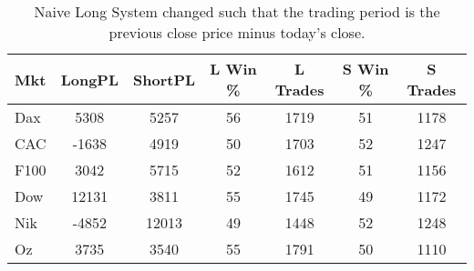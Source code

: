 \begin{table}[ht]
\centering
\caption[Naive Long System - Close to Close]{Naive Long System changed such that the trading period is the previous close price minus today's close.} 
\label{tab:aroon_results}
\begin{tabular}{lcccccc}
  \toprule Mkt & LongPL & ShortPL & L Win \% & L Trades & S Win \% & S Trades \\ 
  \midrule Dax & 5308 & 5257 & 56 & 1719 & 51 & 1178 \\ 
  CAC & -1638 & 4919 & 50 & 1703 & 52 & 1247 \\ 
  F100 & 3042 & 5715 & 52 & 1612 & 51 & 1156 \\ 
  Dow & 12131 & 3811 & 55 & 1745 & 49 & 1172 \\ 
  Nik & -4852 & 12013 & 49 & 1448 & 52 & 1248 \\ 
  Oz & 3735 & 3540 & 55 & 1791 & 50 & 1110 \\ 
   \bottomrule \end{tabular}
\end{table}
